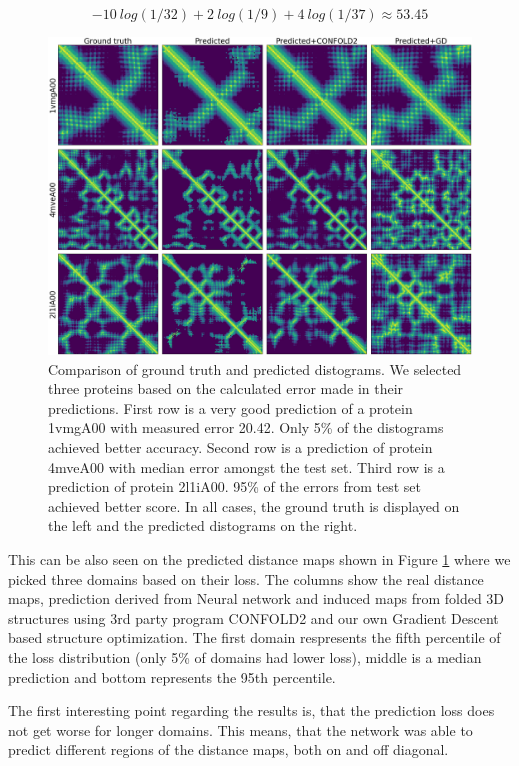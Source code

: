 $$- 10~log(1/32) + 2~log(1/9) + 4~log(1 / 37) \approx 53.45$$

\begin{figure}
    \centering
    \includegraphics[width=\linewidth]{imgs_andy/distograms/distance_maps_test_structures.png}
    \caption{Comparison of ground truth and predicted distograms. We selected three proteins based on the calculated error made in their predictions. First row is a very good prediction of a protein 1vmgA00 with measured error 20.42. Only 5\% of the distograms achieved better accuracy. Second row is a prediction of protein 4mveA00 with median error amongst the test set. Third row is a prediction of protein 2l1iA00. 95\% of the errors from test set achieved better score. In all cases, the ground truth is displayed on the left and the predicted distograms on the right.}
    \label{fig:distograms}
\end{figure}

This can be also seen on the predicted distance maps shown in Figure \ref{fig:distograms} where we picked three domains based on their loss. The columns show the real distance maps, prediction derived from Neural network and induced maps from folded 3D structures using 3rd party program CONFOLD2 and our own Gradient Descent based structure optimization. The first domain respresents the fifth percentile of the loss distribution (only 5\% of domains had lower loss), middle is a median prediction and bottom represents the 95th percentile.

The first interesting point regarding the results is, that the prediction loss does not get worse for longer domains. This means, that the network was able to predict different regions of the distance maps, both on and off diagonal.

